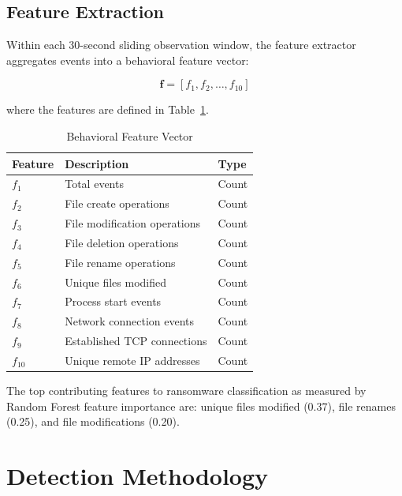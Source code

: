 \documentclass[conference]{IEEEtran}
\begin{document}
\subsection{Feature Extraction}

Within each 30-second sliding observation window, the feature
extractor aggregates events into a behavioral feature vector:

\begin{equation}
\mathbf{f} = [f_1, f_2, \ldots, f_{10}]
\end{equation}

where the features are defined in Table~\ref{tab:features}.

\begin{table}[htbp]
\caption{Behavioral Feature Vector}
\label{tab:features}
\centering
\begin{tabular}{@{}lll@{}}
\toprule
\textbf{Feature} & \textbf{Description} & \textbf{Type} \\
\midrule
$f_1$ & Total events & Count \\
$f_2$ & File create operations & Count \\
$f_3$ & File modification operations & Count \\
$f_4$ & File deletion operations & Count \\
$f_5$ & File rename operations & Count \\
$f_6$ & Unique files modified & Count \\
$f_7$ & Process start events & Count \\
$f_8$ & Network connection events & Count \\
$f_9$ & Established TCP connections & Count \\
$f_{10}$ & Unique remote IP addresses & Count \\
\bottomrule
\end{tabular}
\end{table}

The top contributing features to ransomware classification
as measured by Random Forest feature importance are:
unique files modified (0.37), file renames (0.25), and
file modifications (0.20).


\section{Detection Methodology}
\end{document}
